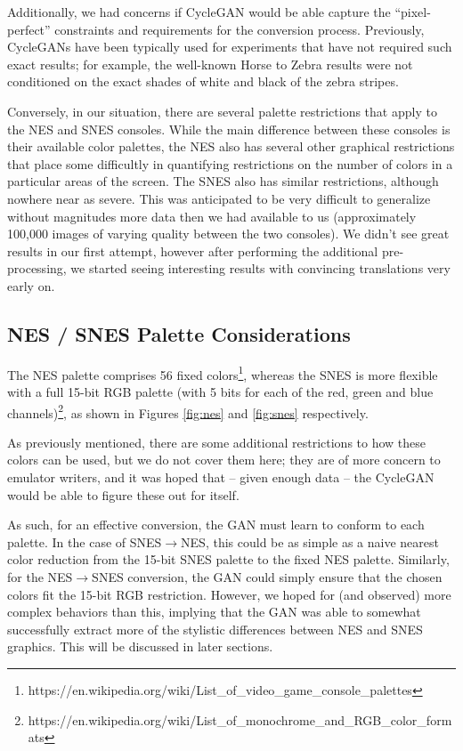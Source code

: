 \documentclass[10pt,twocolumn,letterpaper]{article}
\begin{document}
Additionally, we had concerns if CycleGAN would be able capture the ``pixel-perfect'' constraints and requirements for the conversion process. Previously, CycleGANs have been typically used for experiments that have not required such exact results; for example, the well-known Horse to Zebra results were not conditioned on the exact shades of white and black of the zebra stripes.

Conversely, in our situation, there are several palette restrictions that apply to the NES and SNES consoles. While the main difference between these consoles is their available color palettes, the NES also has several other graphical restrictions that place some difficultly in quantifying restrictions on the number of colors in a particular areas of the screen. The SNES also has similar restrictions, although nowhere near as severe. This was anticipated to be very difficult to generalize without magnitudes more data then we had available to us (approximately 100,000 images of varying quality between the two consoles). We didn't see great results in our first attempt, however after performing the additional pre-processing, we started seeing interesting results with convincing translations very early on.


\subsection{NES / SNES Palette Considerations}
The NES palette comprises 56 fixed colors\footnote{https://en.wikipedia.org/wiki/List\_of\_video\_game\_console\_palettes}, whereas the SNES is more flexible with a full 15-bit RGB palette (with 5 bits for each of the red, green and blue channels)\footnote{https://en.wikipedia.org/wiki/List\_of\_monochrome\_and\_RGB\_color\_formats}, as shown in Figures \ref{fig:nes} and \ref{fig:snes} respectively.

As previously mentioned, there are some additional restrictions to how these colors can be used, but we do not cover them here; they are of more concern to emulator writers, and it was hoped that \--- given enough data \--- the CycleGAN would be able to figure these out for itself.

As such, for an effective conversion, the GAN must learn to conform to each palette. In the case of SNES${\rightarrow}$NES, this could be as simple as a naive nearest color reduction from the 15-bit SNES palette to the fixed NES palette. Similarly, for the NES${\rightarrow}$SNES conversion, the GAN could simply ensure that the chosen colors fit the 15-bit RGB restriction. However, we hoped for (and observed) more complex behaviors than this, implying that the GAN was able to somewhat successfully extract more of the stylistic differences between NES and SNES graphics. This will be discussed in later sections.
\end{document}
